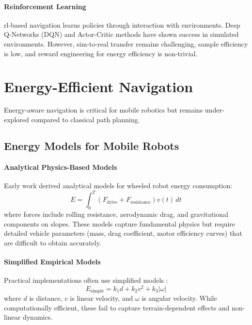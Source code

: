 \paragraph{Reinforcement Learning}
\acrshort{rl}-based navigation \cite{Tai2017,Long2018} learns policies through interaction with environments. Deep Q-Networks (DQN) and Actor-Critic methods have shown success in simulated environments. However, sim-to-real transfer remains challenging, sample efficiency is low, and reward engineering for energy efficiency is non-trivial.

\section{Energy-Efficient Navigation}
\label{sec:lit_energy}

Energy-aware navigation is critical for mobile robotics but remains under-explored compared to classical path planning.

\subsection{Energy Models for Mobile Robots}

\paragraph{Analytical Physics-Based Models}
Early work \cite{Mei2005,Tokekar2014} derived analytical models for wheeled robot energy consumption:
\begin{equation}
E = \int_0^T \left( F_{\text{drive}} + F_{\text{resistance}} \right) v(t) \, dt
\end{equation}
where forces include rolling resistance, aerodynamic drag, and gravitational components on slopes. These models capture fundamental physics but require detailed vehicle parameters (mass, drag coefficient, motor efficiency curves) that are difficult to obtain accurately.

\paragraph{Simplified Empirical Models}
Practical implementations often use simplified models \cite{Sun2015}:
\begin{equation}
E_{\text{simple}} = k_1 d + k_2 v^2 + k_3 |\omega|
\end{equation}
where $d$ is distance, $v$ is linear velocity, and $\omega$ is angular velocity. While computationally efficient, these fail to capture terrain-dependent effects and non-linear dynamics.

